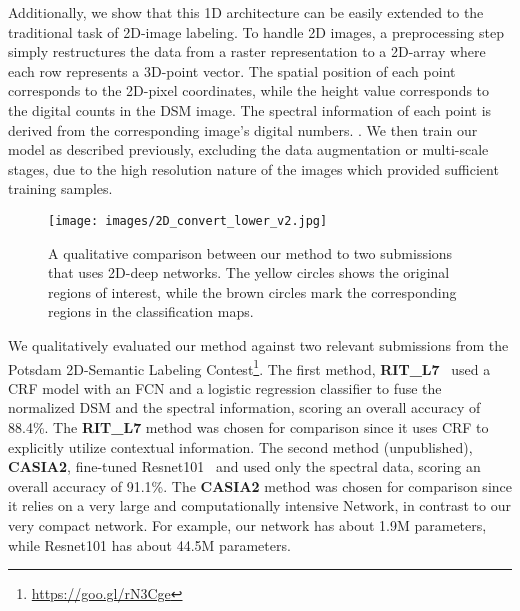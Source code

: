 \documentclass[final,3p,times,twocolumn,authoryear]{elsarticle}
\newcommand{\mxy}[1]{ \color{red}{#1}}
\begin{document}
Additionally, we show that this 1D architecture can be easily extended to the traditional task of 2D-image labeling. 
To handle 2D images, a preprocessing step simply restructures the data from a raster representation to a 2D-array where each row represents a 3D-point vector.%
The spatial position of each point corresponds to the 2D-pixel coordinates, while the height value corresponds to the digital counts in the DSM image.
The spectral information of each point is derived from the corresponding image's digital numbers. . 
We then train our model as described previously, excluding the data augmentation or multi-scale stages, due to the high resolution nature of the images which provided sufficient training samples. %
\begin{figure*}[th]
\begin{center}
\texttt{[image: images/2D\_convert\_lower\_v2.jpg]}
\end{center}
\caption{A qualitative comparison between our method to two submissions that uses 2D-deep networks. The yellow circles shows the original regions of interest, while the brown circles mark the corresponding regions in the classification maps.}
\label{fig:2D_seg_lower}
\end{figure*}

We qualitatively evaluated our method against two relevant submissions from the Potsdam 2D-Semantic Labeling Contest\footnote{\url{https://goo.gl/rN3Cge}}. 
The first method, {\bf RIT\_L7}~\citep{Yansong} used a CRF model with an FCN and a logistic regression classifier to fuse the normalized DSM and the spectral information, scoring an overall accuracy of 88.4\%.
The {\bf RIT\_L7} method was chosen for comparison since it uses CRF to explicitly utilize contextual information.
The second method (unpublished), {\bf CASIA2}, fine-tuned Resnet101~\citep{resnet} and used only the spectral data, scoring an overall accuracy of 91.1\%. 
 The {\bf CASIA2} method was chosen for comparison since it relies on a very large and computationally intensive Network, in contrast to our very compact network. 
For example, our network has about 1.9M parameters, while Resnet101 has about 44.5M parameters. 
\end{document}

